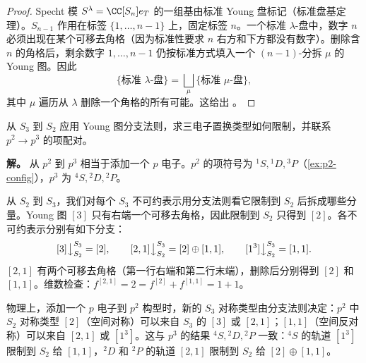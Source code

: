 \begin{proof}
Specht 模 $S^\lambda=\CC[S_n]e_T$ 的一组基由标准 Young 盘标记（标准盘基定理）。$S_{n-1}$ 作用在标签 $\{1,\dots,n-1\}$ 上，固定标签 $n$。一个标准 $\lambda$-盘中，数字 $n$ 必须出现在某个可移去角格（因为标准性要求 $n$ 右方和下方都没有数字）。删除含 $n$ 的角格后，剩余数字 $1,\dots,n-1$ 仍按标准方式填入一个 $(n-1)$-分拆 $\mu$ 的 Young 图。因此
\[
\{\text{标准 }\lambda\text{-盘}\}
=\bigsqcup_{\mu}\{\text{标准 }\mu\text{-盘}\},
\]
其中 $\mu$ 遍历从 $\lambda$ 删除一个角格的所有可能。这给出 。
\end{proof}

\begin{example}[{分支法则的物理应用：$p^2\to p^3$}]
从 $S_3$ 到 $S_2$ 应用 Young 图分支法则，求三电子置换类型如何限制，并联系 $p^2\to p^3$ 的项配对。

\textbf{解。} 从 $p^2$ 到 $p^3$ 相当于添加一个 $p$ 电子。$p^2$ 的项符号为 ${}^1S,{}^1D,{}^3P$（\cref{ex:p2-config}），$p^3$ 为 ${}^4S,{}^2D,{}^2P$。

从 $S_2$ 到 $S_3$，我们对每个 $S_3$ 不可约表示用分支法则看它限制到 $S_2$ 后拆成哪些分量。Young 图 $[3]$ 只有右端一个可移去角格，因此限制到 $S_2$ 只得到 $[2]$。各不可约表示分别有如下分支：
\[
[3]\big\downarrow_{S_2}^{S_3}=[2],
\qquad
[2,1]\big\downarrow_{S_2}^{S_3}=[2]\oplus[1,1],
\qquad
[1^3]\big\downarrow_{S_2}^{S_3}=[1,1].
\]
$[2,1]$ 有两个可移去角格（第一行右端和第二行末端），删除后分别得到 $[2]$ 和 $[1,1]$。维数检查：$f^{[2,1]}=2=f^{[2]}+f^{[1,1]}=1+1$。

物理上，添加一个 $p$ 电子到 $p^2$ 构型时，新的 $S_3$ 对称类型由分支法则决定：$p^2$ 中 $S_2$ 对称类型 $[2]$（空间对称）可以来自 $S_3$ 的 $[3]$ 或 $[2,1]$；$[1,1]$（空间反对称）可以来自 $[2,1]$ 或 $[1^3]$。这与 $p^3$ 的结果 ${}^4S,{}^2D,{}^2P$ 一致：$^4S$ 的轨道 $[1^3]$ 限制到 $S_2$ 给 $[1,1]$，$^2D$ 和 $^2P$ 的轨道 $[2,1]$ 限制到 $S_2$ 给 $[2]\oplus[1,1]$。
\end{example}


